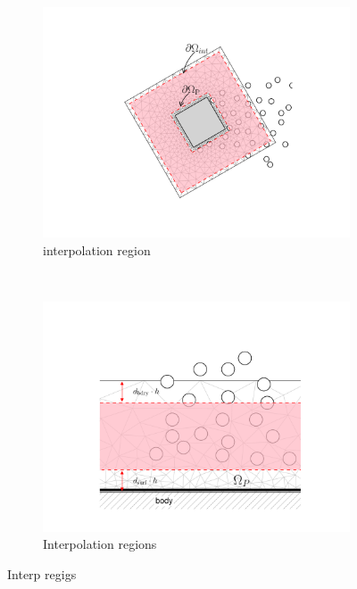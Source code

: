 	\begin{figure}[t]
     \centering
     \begin{subfigure}[t]{0.35\textwidth}
             \includegraphics[trim=4.37cm 1.58cm 3.86cm 1.58cm, clip, width=\linewidth]{./figures/hybrid/interpolation/interpRegion.pdf}
             \caption{interpolation region}
             \label{fig:interpRegion}
     \end{subfigure}%
     ~ %
     \begin{subfigure}[t]{0.6\textwidth}
             \includegraphics[width=\linewidth]{./figures/hybrid/interpolation/hybrid_domains_withInterpReg.pdf}
             \caption{Interpolation regions}
             \label{fig:hybrid_domains_withInterpReg}
     \end{subfigure}

     \caption{Interp regigs}
     \label{fig:interpolationRegionDefinitions}
	\end{figure}	

